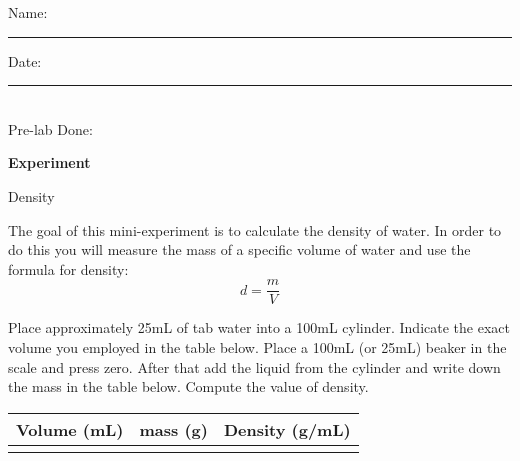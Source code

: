 \documentclass[main.tex]{subfiles}
\begin{document}
\begin{fullwidth}
\begin{enumerate}
\end{enumerate}


\clearpage\mbox{}\clearpage



\begin{multicols}{2}
\begin{tcolorbox}[enhanced jigsaw,breakable,size=title,
colback=mybrown!05,colframe=black,fonttitle=\bfseries,
title=STUDENT INFO,pad at break=1mm, break at=15cm/0pt ]
\vspace{0.2cm}
\noindent Name: \rule{5cm}{0.4pt}Date:\rule{1cm}{0.4pt}\\
Pre-lab Done: \quad
\end{tcolorbox}
\end{multicols}
\hfill
\vspace{0.2cm}
\begin{center}
{\large \bfseries 
Experiment
\par
\Huge
Density
\\[5pt] \par}
\vspace{0.2cm}
\end{center}
\par
\noindent
\uline{  \hfill \normalsize \hfill       }

\vspace{0.2cm}{\large \bfseries 1. Density of water}
The goal of this mini-experiment is to calculate the density of water. In order to do this you will measure the mass of a specific volume of water and use the formula for density:
\begin{equation*}
d=\frac{m}{V}
\end{equation*}
\begin{steps}
    \newstep[] Place approximately 25mL of tab water into a 100mL cylinder. Indicate the exact volume you employed in the table below.    
    \newstep[] Place a 100mL (or 25mL) beaker in the scale and press zero. After that add the liquid from the cylinder and write down the mass in the table below.
     \newstep[] Compute the value of density.
\end{steps}

\begin{center}\begin{tabular}{ |p{4cm}|p{4cm}|p{4cm}|  }
\hline
    Volume (mL) &  mass (g) &  Density  (g/mL)         \\
\hline
   \vspace{0cm}\vspace{.5cm} &     &            \\
\hline
\end{tabular}\end{center}



\end{fullwidth}
\end{document}
